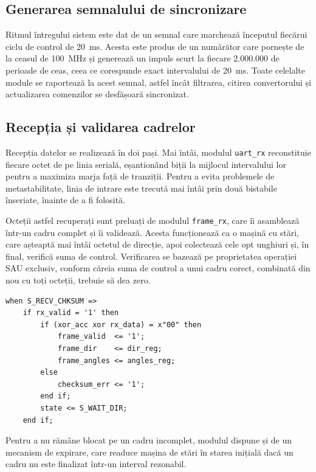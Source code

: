 \subsection{Generarea semnalului de sincronizare}

Ritmul întregului sistem este dat de un semnal care marchează începutul fiecărui
ciclu de control de 20~ms. Acesta este produs de un numărător care pornește de la
ceasul de 100~MHz și generează un impuls scurt la fiecare 2.000.000 de perioade de
ceas, ceea ce corespunde exact intervalului de 20~ms. Toate celelalte module se
raportează la acest semnal, astfel încât filtrarea, citirea convertorului și
actualizarea comenzilor se desfășoară sincronizat.

\subsection{Recepția și validarea cadrelor}

Recepția datelor se realizează în doi pași. Mai întâi, modulul \texttt{uart\_rx}
reconstituie fiecare octet de pe linia serială, eșantionând biții la mijlocul
intervalului lor pentru a maximiza marja față de tranziții. Pentru a evita
problemele de metastabilitate, linia de intrare este trecută mai întâi prin două
bistabile înseriate, înainte de a fi folosită.

Octeții astfel recuperați sunt preluați de modulul \texttt{frame\_rx}, care îi
asamblează într-un cadru complet și îi validează. Acesta funcționează ca o mașină
cu stări, care așteaptă mai întâi octetul de direcție, apoi colectează cele opt
unghiuri și, în final, verifică suma de control. Verificarea se bazează pe
proprietatea operației SAU exclusiv, conform căreia suma de control a unui cadru
corect, combinată din nou cu toți octeții, trebuie să dea zero.

\begin{lstlisting}[caption={Verificarea sumei de control la recepție.},label={lst:checksum}]
when S_RECV_CHKSUM =>
    if rx_valid = '1' then
        if (xor_acc xor rx_data) = x"00" then
            frame_valid  <= '1';
            frame_dir    <= dir_reg;
            frame_angles <= angles_reg;
        else
            checksum_err <= '1';
        end if;
        state <= S_WAIT_DIR;
    end if;
\end{lstlisting}

Pentru a nu rămâne blocat pe un cadru incomplet, modulul dispune și de un mecanism
de expirare, care readuce mașina de stări în starea inițială dacă un cadru nu este
finalizat într-un interval rezonabil.

